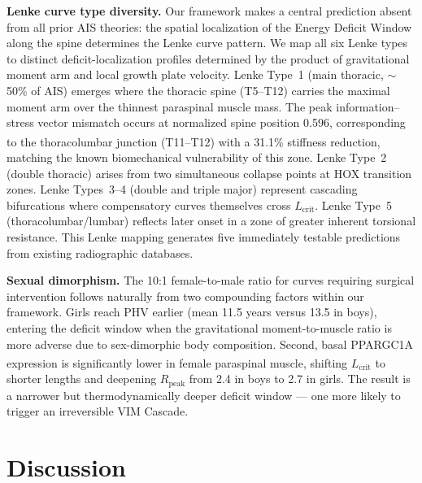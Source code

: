 \documentclass[12pt]{article}
\begin{document}
\textbf{Lenke curve type diversity.} Our framework makes a central prediction absent from all prior AIS theories: the spatial localization of the Energy Deficit Window along the spine determines the Lenke curve pattern. We map all six Lenke types to distinct deficit-localization profiles determined by the product of gravitational moment arm and local growth plate velocity. Lenke Type~1 (main thoracic, $\sim$50\% of AIS) emerges where the thoracic spine (T5--T12) carries the maximal moment arm over the thinnest paraspinal muscle mass. The peak information--stress vector mismatch occurs at normalized spine position 0.596, corresponding to the thoracolumbar junction (T11--T12) with a 31.1\% stiffness reduction\textsuperscript{\cite{weinstein2008}}, matching the known biomechanical vulnerability of this zone. Lenke Type~2 (double thoracic) arises from two simultaneous collapse points at HOX transition zones. Lenke Types~3--4 (double and triple major) represent cascading bifurcations where compensatory curves themselves cross $L_{\text{crit}}$. Lenke Type~5 (thoracolumbar/lumbar) reflects later onset in a zone of greater inherent torsional resistance. This Lenke mapping generates five immediately testable predictions from existing radiographic databases.

\textbf{Sexual dimorphism.} The 10:1 female-to-male ratio for curves requiring surgical intervention follows naturally from two compounding factors within our framework. Girls reach PHV earlier (mean 11.5 years versus 13.5 in boys), entering the deficit window when the gravitational moment-to-muscle ratio is more adverse due to sex-dimorphic body composition. Second, basal PPARGC1A expression is significantly lower in female paraspinal muscle\textsuperscript{\cite{handschin2008}}, shifting $L_{\text{crit}}$ to shorter lengths and deepening $R_{\text{peak}}$ from 2.4 in boys to 2.7 in girls. The result is a narrower but thermodynamically deeper deficit window --- one more likely to trigger an irreversible VIM Cascade.

\section*{Discussion}
\end{document}
